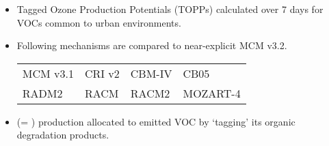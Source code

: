 \begin{BlueBox}
    \vskip-1cm
    \begin{block}{}
        \begin{itemize} 
            \item Tagged Ozone Production Potentials (TOPPs) \citep{Butler:2011} calculated over 7 days for VOCs common to urban environments. \vspace{5mm}
            \item Following mechanisms are compared to near-explicit MCM v3.2.
                {
                     \normalsize
                    \begin{table}[htp]
                        \begin{center}
                            \begin{tabular}{P{7cm}P{7cm}P{7cm}P{7cm}}
                                MCM v3.1 & CRI v2 & CBM-IV & CB05 \\
                                RADM2 & RACM & RACM2 & MOZART-4 
                            \end{tabular}
                        \end{center}
                    \end{table}
                } \vspace{5mm}
            \item {} (= ) production allocated to emitted VOC by `tagging' its organic degradation products. \vspace{4mm}
        \end{itemize}
    \end{block}
\end{BlueBox}
